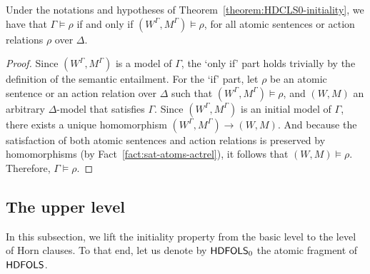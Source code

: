\documentclass[a4paper,UKenglish,cleveref,autoref]{lipics-v2019}
\begin{document}
\begin{corollary}
  \label{corollary:HDCLS0-initiality}
  Under the notations and hypotheses of Theorem~\ref{theorem:HDCLS0-initiality}, we have that\/
  \(\Gamma \models \rho\) if and only if \((W^{\Gamma}, M^{\Gamma}) \models \rho\),
  for all atomic sentences or action relations \(\rho\) over \(\Delta\).
\end{corollary}
\begin{proof}
  Since \((W^{\Gamma}, M^{\Gamma})\) is a model of \(\Gamma\), the `only if' part holds trivially by the definition of the semantic entailment.
  For the `if' part, let \(\rho\) be an atomic sentence or an action relation over \(\Delta\) such that \((W^{\Gamma}, M^{\Gamma}) \models \rho\), and \((W, M)\) an arbitrary \(\Delta\)-model that satisfies \(\Gamma\).
  Since \((W^{\Gamma}, M^{\Gamma})\) is an initial model of \(\Gamma\), there exists a unique homomorphism \((W^{\Gamma}, M^{\Gamma}) \to (W, M)\).
  And because the satisfaction of both atomic sentences and action relations is preserved by homomorphisms (by Fact~\ref{fact:sat-atoms-actrel}), it follows that \((W, M) \models \rho\).
  Therefore, \(\Gamma \models \rho\).
\end{proof}


\subsection{The upper level}
\label{subsection:upper-level}

In this subsection, we lift the initiality property from the basic level to the level of Horn clauses.
To that end, let us denote by \({\mathsf{HDFOLS}}_{0}\) the atomic fragment of \({\mathsf{HDFOLS}}\).
\end{document}

